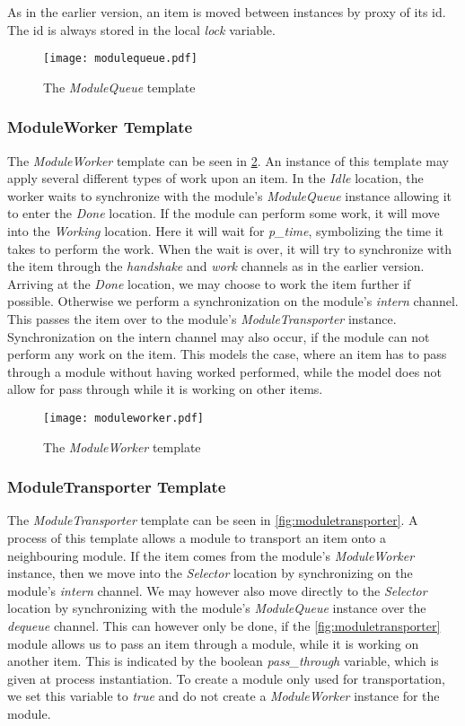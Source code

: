 As in the earlier version, an item is moved between instances by proxy of its id. The id is always stored in the local \emph{lock} variable.   

\begin{figure}[H]
\centering
\texttt{[image: modulequeue.pdf]}
\caption{The \textit{ModuleQueue} template}
\label{fig:modulequeue}
\end{figure}


\subsubsection{ModuleWorker Template}\label{subs:moduleworker}
The \emph{ModuleWorker} template can be seen in \cref{fig:moduleworker}. An instance of this template may apply several different types of work upon an item. In the \textit{Idle} location, the worker waits to synchronize with the module's \emph{ModuleQueue} instance allowing it to enter the \textit{Done} location. If the module can perform some work, it will move into the \emph{Working} location. Here it will wait for \emph{p\_time}, symbolizing the time it takes to perform the work. When the wait is over, it will try to synchronize with the item through the \emph{handshake} and \emph{work} channels as in the earlier version. Arriving at the \emph{Done} location, we may choose to work the item further if possible. Otherwise we perform a synchronization on the module's \emph{intern} channel. This passes the item over to the module's \emph{ModuleTransporter} instance. Synchronization on the intern channel may also occur, if the module can not perform any work on the item. This models the case, where an item has to pass through a module without having worked performed, while the model does not allow for pass through while it is working on other items.

\begin{figure}[H]
\centering
\texttt{[image: moduleworker.pdf]}
\caption{The \textit{ModuleWorker} template}
\label{fig:moduleworker}
\end{figure}

\subsubsection{ModuleTransporter Template}
The \emph{ModuleTransporter} template can be seen in \cref{fig:moduletransporter}. A process of this template allows a module to transport an item onto a neighbouring module. If the item comes from the module's \emph{ModuleWorker} instance, then we move into the \emph{Selector} location by synchronizing on the module's \emph{intern} channel. We may however also move directly to the \emph{Selector} location by synchronizing with the module's \emph{ModuleQueue} instance over the \emph{dequeue} channel. This can however only be done, if the \cref{fig:moduletransporter} module allows us to pass an item through a module, while it is working on another item. This is indicated by the boolean \emph{pass\_through} variable, which is given at process instantiation. To create a module only used for transportation, we set this variable to \emph{true} and do not create a \emph{ModuleWorker} instance for the module. 

